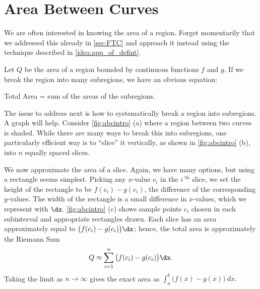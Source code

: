 \section{Area Between Curves}\label{sec:ABC}

We are often interested in knowing the area of a region. Forget momentarily that we addressed this already in \autoref{sec:FTC} and approach it instead using the technique described in \autoref{idea:app_of_defint}. 


Let $Q$ be the area of a region bounded by continuous functions $f$ and $g$. If we break the region into many subregions, we have an obvious equation:
\begin{center}
Total Area = sum of the areas of the subregions.
\end{center}
The issue to address next is how to systematically break a region into subregions. A graph will help. Consider \autoref{fig:abcintro} (a) where a region between two curves is shaded. While there are many ways to break this into subregions, one particularly efficient way is to ``slice'' it vertically, as shown in \autoref{fig:abcintro} (b), into $n$ equally spaced slices.

We now approximate the area of a slice. Again, we have many options, but using a rectangle seems simplest. Picking any $x$-value $c_i$ in the $i^\text{ th}$ slice, we set the height of the rectangle to be $f(c_i)-g(c_i)$, the difference of the corresponding $y$-values. The width of the rectangle is a small difference in $x$-values, which we represent with $\dx$. \autoref{fig:abcintro} (c) shows sample points $c_i$ chosen in each subinterval and appropriate rectangles drawn.
Each slice has an area approximately equal to $\big(f(c_i)-g(c_i)\big)\dx$; hence, the total area is approximately the Riemann Sum
$$Q \approx \sum_{i=1}^n \big(f(c_i)-g(c_i)\big)\dx.$$
Taking the limit as $n\to \infty$ gives the exact area as $\int_a^b \big(f(x)-g(x)\big)\ dx.$

